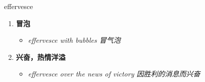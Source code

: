 
\begin{frame}
{\huge effervesce}
\begin{center}
\begin{enumerate}\Large
  \item \textbf{冒泡}
  \begin{itemize}
    \item \em{\Large{effervesce with bubbles 冒气泡}}
  \end{itemize}
  \item \textbf{兴奋，热情洋溢}
  \begin{itemize}
    \item \em{\Large{effervesce over the news of victory 因胜利的消息而兴奋}}
  \end{itemize}
\end{enumerate}
\end{center}
\end{frame}
